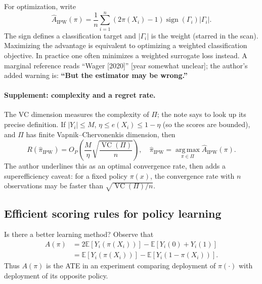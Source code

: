 For optimization, write
\[
 \widehat A_{\mathrm{IPW}}(\pi)
 =\frac1n\sum_{i=1}^n(2\pi(X_i)-1)
 \operatorname{sign}(\Gamma_i)|\Gamma_i|.\tag{11.12}
\]
The sign defines a classification target and $|\Gamma_i|$ is the weight (starred in the scan). Maximizing the advantage is equivalent to optimizing a weighted classification objective. In practice one often minimizes a weighted surrogate loss instead. A marginal reference reads ``Wager [2020]'' [year somewhat unclear]; the author's added warning is: \textbf{``But the estimator may be wrong.''}

\paragraph{Supplement: complexity and a regret rate.}
The VC dimension measures the complexity of $\Pi$; the note says to look up its precise definition. If $|Y_i|\le M$, $\eta\le e(X_i)\le1-\eta$ (so the scores are bounded), and $\Pi$ has finite Vapnik--Chervonenkis dimension, then
\[
 R(\widehat\pi_{\mathrm{IPW}})
 =O_P\left(\frac M\eta\sqrt{\frac{\operatorname{VC}(\Pi)}n}\right),
 \quad
 \widehat\pi_{\mathrm{IPW}}=
 \operatorname*{arg\,max}_{\pi\in\Pi}\widehat A_{\mathrm{IPW}}(\pi).
\]
The author underlines this as an optimal convergence rate, then adds a superefficiency caveat: for a fixed policy $\pi(x)$, the convergence rate with $n$ observations may be faster than $\sqrt{\operatorname{VC}(\Pi)/n}$.

\subsection{Efficient scoring rules for policy learning}
Is there a better learning method? Observe that
\begin{align*}
 A(\pi)&=2\mathbb E[Y_i(\pi(X_i))]-\mathbb E[Y_i(0)+Y_i(1)]\\
 &=\mathbb E[Y_i(\pi(X_i))]-\mathbb E[Y_i(1-\pi(X_i))].
\end{align*}
Thus $A(\pi)$ is the ATE in an experiment comparing deployment of $\pi(\cdot)$ with deployment of its opposite policy.

